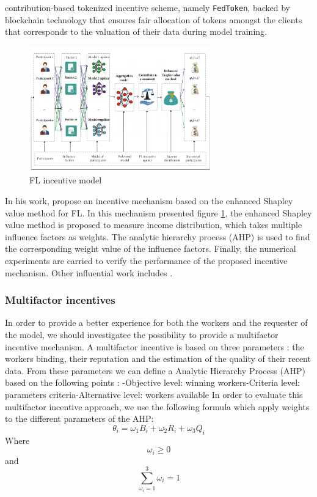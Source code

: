 \documentclass{article}
\begin{document}
contribution-based tokenized incentive scheme, namely \texttt{FedToken}, backed by blockchain technology that ensures fair allocation of tokens amongst the clients that corresponds to the valuation of their data during model training. 
\begin{figure}[!ht]
    \centering
    \includegraphics[width=8cm]{assets/incentiveGraph.PNG}
    \caption{FL incentive model}
    \label{fig:incentive_graph}
\end{figure}
\newline \newline In his work, \cite{weijie_2022} propose an incentive mechanism based on the enhanced Shapley value method for FL. In this mechanism presented figure \ref{fig:incentive_graph}, the enhanced Shapley value method is proposed to measure income distribution, which takes multiple influence factors as weights. The analytic hierarchy process (AHP) is used to find the corresponding weight value of the influence factors. Finally, the numerical experiments are carried to verify the performance of the proposed incentive mechanism. Other influential work includes \cite{lu_2020}. 

\subsubsection{Multifactor incentives}
In order to provide a better experience for both the workers and the requester of the model, we should investigatee the possibility to provide a multifactor incentive mechanism. A multifactor incentive is based on three parameters : the workers binding, their reputation and the estimation of the quality of their recent data. From these parameters we can define a Analytic Hierarchy Process (AHP) based on the following points : 
\newline -Objective level: winning workers\newline -Criteria level: parameters criteria\newline -Alternative level: workers available \newline In order to evaluate this multifactor incentive approach, we use the following formula which apply weights to the different parameters of the AHP:
\begin{equation}
    \theta_{i}=\omega_{1} B_{i}+\omega_{2} R_{i}+\omega_{3} Q_{i}  	
\end{equation}
Where  \begin{equation} \omega_{i} \geq 0 \end{equation}
and  \begin{equation} \sum_{\omega_{i}=1}^{3} \omega_{i}=1 \end{equation}
\end{document}
